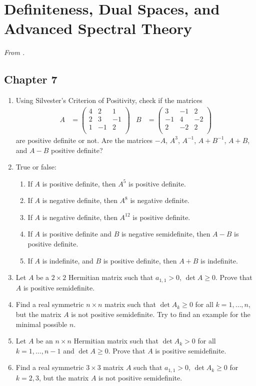 \documentclass[../psets.tex]{subfiles}
\begin{document}
\section{Definiteness, Dual Spaces, and Advanced Spectral Theory}
\emph{From \textcite{bib:Treil}.}
\subsection*{Chapter 7}
\begin{enumerate}[label={\textbf{4.\arabic*.}}]
    \item {}Using Silvester's Criterion of Positivity, check if the matrices
    \begin{align*}
        A &=
        \begin{pmatrix}
            4 & 2 & 1\\
            2 & 3 & -1\\
            1 & -1 & 2\\
        \end{pmatrix}&
        B &=
        \begin{pmatrix}
            3 & -1 & 2\\
            -1 & 4 & -2\\
            2 & -2 & 2\\
        \end{pmatrix}
    \end{align*}
    are positive definite or not. Are the matrices $-A$, $A^3$, $A^{-1}$, $A+B^{-1}$, $A+B$, and $A-B$ positive definite?
    \item True or false:
    \begin{enumerate}
        \item If $A$ is positive definite, then $A^5$ is positive definite.
        \item If $A$ is negative definite, then $A^8$ is negative definite.
        \item If $A$ is negative definite, then $A^{12}$ is positive definite.
        \item If $A$ is positive definite and $B$ is negative semidefinite, then $A-B$ is positive definite.
        \item If $A$ is indefinite, and $B$ is positive definite, then $A+B$ is indefinite.
    \end{enumerate}
    \item Let $A$ be a $2\times 2$ Hermitian matrix such that $a_{1,1}>0$, $\det A\geq 0$. Prove that $A$ is positive semidefinite.
    \item Find a real symmetric $n\times n$ matrix such that $\det A_k\geq 0$ for all $k=1,\dots,n$, but the matrix $A$ is not positive semidefinite. Try to find an example for the minimal possible $n$.
    \item Let $A$ be an $n\times n$ Hermitian matrix such that $\det A_k>0$ for all $k=1,\dots,n-1$ and $\det A\geq 0$. Prove that $A$ is positive semidefinite.
    \item Find a real symmetric $3\times 3$ matrix $A$ such that $a_{1,1}>0$, $\det A_k\geq 0$ for $k=2,3$, but the matrix $A$ is not positive semidefinite.
\end{enumerate}
\end{document}
